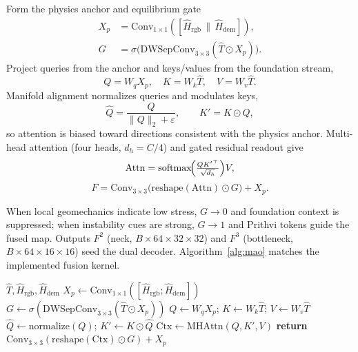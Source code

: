\begin{definition}
\label{def:mao}
Form the physics anchor and equilibrium gate
\begin{equation}
\label{eq:mao-xp}
\begin{aligned}
X_p&=\mathrm{Conv}_{1\times1}
([\hat{H}_{\mathrm{rgb}}\,\|\,\hat{H}_{\mathrm{dem}}]),\\
G&=\sigma\!\bigl(
\mathrm{DWSepConv}_{3\times3}(\hat{T}\odot X_p)
\bigr).
\end{aligned}
\end{equation}
Project queries from the anchor and keys/values from the foundation stream,
\begin{equation}
\label{eq:mao-qkv}
Q=W_q X_p,\quad
K=W_k\hat{T},\quad
V=W_v\hat{T}.
\end{equation}
Manifold alignment normalizes queries and modulates keys,
\begin{equation}
\label{eq:mao-align}
\hat{Q}=\frac{Q}{\|Q\|_2+\varepsilon},\qquad
K'=K\odot\hat{Q},
\end{equation}
so attention is biased toward directions consistent with the physics anchor. Multi-head attention (four heads, \(d_h=C/4\)) and gated residual readout give
\begin{equation}
\label{eq:mao-attn}
\mathrm{Attn}
=\mathrm{softmax}\!\Bigl(
\tfrac{Q{K'}^{\top}}{\sqrt{d_h}}
\Bigr)V,
\end{equation}
\begin{equation}
\label{eq:mao-out}
F=\mathrm{Conv}_{3\times3}
\bigl(\mathrm{reshape}(\mathrm{Attn})\odot G\bigr)
+X_p.
\end{equation}
\end{definition}
When local geomechanics indicate low stress, \(G\to0\) and foundation context is suppressed; when instability cues are strong, \(G\to1\) and Prithvi tokens guide the fused map. Outputs \(F^{2}\) (neck, \(B{\times}64{\times}32{\times}32\)) and \(F^{3}\) (bottleneck, \(B{\times}64{\times}16{\times}16\)) seed the dual decoder. Algorithm~\ref{alg:mao} matches the implemented fusion kernel.

\begin{algorithm}[htbp]
\caption{MAO-GeoEGCA (neck / bottleneck)}
\label{alg:mao}
\begin{algorithmic}
\Require \(\hat{T},\hat{H}_{\mathrm{rgb}},\hat{H}_{\mathrm{dem}}\)
\State \(X_p\leftarrow\mathrm{Conv}_{1\times1}([\hat{H}_{\mathrm{rgb}};\hat{H}_{\mathrm{dem}}])\)
\State \(G\leftarrow\sigma(\mathrm{DWSepConv}_{3\times3}(\hat{T}\odot X_p))\)
\State \(Q\leftarrow W_q X_p\); \(K\leftarrow W_k\hat{T}\); \(V\leftarrow W_v\hat{T}\)
\State \(\hat{Q}\leftarrow\mathrm{normalize}(Q)\); \(K'\leftarrow K\odot\hat{Q}\)
\State \(\mathrm{Ctx}\leftarrow\mathrm{MHAttn}(Q,K',V)\)
\State \textbf{return} \(\mathrm{Conv}_{3\times3}(\mathrm{reshape}(\mathrm{Ctx})\odot G)+X_p\)
\end{algorithmic}
\end{algorithm}

